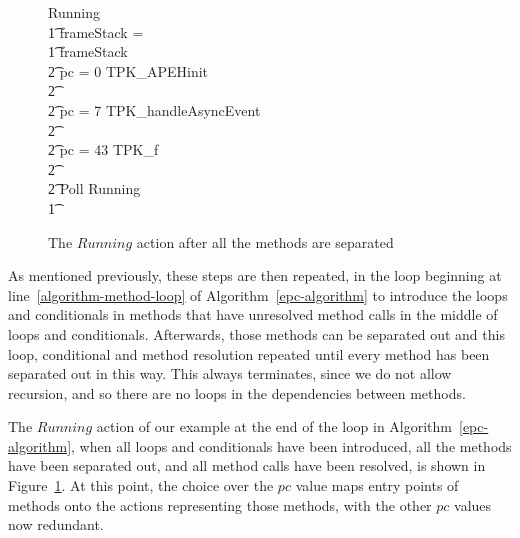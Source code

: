 \begin{figure}[tp!]
  \setlength{\zedindent}{0cm}
  \setlength{\zedtab}{0.3cm}
  \setlength{\zedleftsep}{0cm}
  \setlength{\abovedisplayskip}{0cm}
  \setlength{\belowdisplayskip}{0cm}
  \begin{circus}
    Running \circdef \\
    \t1 \circif frameStack = \emptyset \circthen \Skip \\
    \t1 {} \circelse frameStack \neq \emptyset \circthen {} \\
    \t2 {} \circif pc = 0 \circthen TPK\_APEHinit \\
    \t2 {} \cdots {} \\
    \t2 {} \circelse pc = 7 \circthen TPK\_handleAsyncEvent \\
    \t2 {} \cdots {} \\
    \t2 {} \circelse pc = 43 \circthen TPK\_f \\
    \t2 {} \cdots {} \\
    \t2 \circfi \circseq Poll \circseq Running \\
    \t1 \circfi
  \end{circus}
  \caption{The $Running$ action after all the methods are separated}
  \label{final-method-separation-example-figure}
\end{figure}
  
As mentioned previously, these steps are then repeated, in the loop
beginning at line~\ref{algorithm-method-loop} of
Algorithm~\ref{epc-algorithm} to introduce the loops and conditionals
in methods that have unresolved method calls in the middle of loops
and conditionals.
Afterwards, those methods can be separated out and this loop,
conditional and method resolution repeated until every method has been
separated out in this way.
This always terminates, since we do not allow recursion, and so there
are no loops in the dependencies between methods.

The $Running$ action of our example at the end of the loop in
Algorithm~\ref{epc-algorithm}, when all loops and conditionals have
been introduced, all the methods have been separated out, and all
method calls have been resolved, is shown in
Figure~\ref{final-method-separation-example-figure}.
At this point, the choice over the $pc$ value maps entry points of
methods onto the actions representing those methods, with the other
$pc$ values now redundant.

